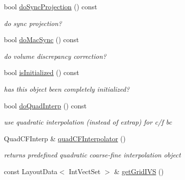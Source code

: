 \begin{DoxyCompactItemize}
\item 
\hypertarget{class_c_c_projector_comp_aded98d54b5b47205e6c60846af5e79f1}{bool \hyperlink{class_c_c_projector_comp_aded98d54b5b47205e6c60846af5e79f1}{do\-Sync\-Projection} () const }\label{class_c_c_projector_comp_aded98d54b5b47205e6c60846af5e79f1}

\begin{DoxyCompactList}\small\item\em do sync projection? \end{DoxyCompactList}\item 
\hypertarget{class_c_c_projector_comp_a7d1f68efecf98bc26f055aa5afbbff93}{bool \hyperlink{class_c_c_projector_comp_a7d1f68efecf98bc26f055aa5afbbff93}{do\-Mac\-Sync} () const }\label{class_c_c_projector_comp_a7d1f68efecf98bc26f055aa5afbbff93}

\begin{DoxyCompactList}\small\item\em do volume discrepancy correction? \end{DoxyCompactList}\item 
\hypertarget{class_c_c_projector_comp_aee178a0fa4030b63590b331e2d7cbc89}{bool \hyperlink{class_c_c_projector_comp_aee178a0fa4030b63590b331e2d7cbc89}{is\-Initialized} () const }\label{class_c_c_projector_comp_aee178a0fa4030b63590b331e2d7cbc89}

\begin{DoxyCompactList}\small\item\em has this object been completely initialized? \end{DoxyCompactList}\item 
\hypertarget{class_c_c_projector_comp_a0ea4ca95e3a16926db8d26ed9e61b664}{bool \hyperlink{class_c_c_projector_comp_a0ea4ca95e3a16926db8d26ed9e61b664}{do\-Quad\-Interp} () const }\label{class_c_c_projector_comp_a0ea4ca95e3a16926db8d26ed9e61b664}

\begin{DoxyCompactList}\small\item\em use quadratic interpolation (instead of extrap) for c/f bc \end{DoxyCompactList}\item 
\hypertarget{class_c_c_projector_comp_a8bd9b76e48aa8f850c0c2d52d8d992d0}{Quad\-C\-F\-Interp \& \hyperlink{class_c_c_projector_comp_a8bd9b76e48aa8f850c0c2d52d8d992d0}{quad\-C\-F\-Interpolator} ()}\label{class_c_c_projector_comp_a8bd9b76e48aa8f850c0c2d52d8d992d0}

\begin{DoxyCompactList}\small\item\em returns predefined quadratic coarse-\/fine interpolation object \end{DoxyCompactList}\item 
\hypertarget{class_c_c_projector_comp_a10aabd90502fe7ef8fe42d5590d28e97}{const Layout\-Data$<$ Int\-Vect\-Set $>$ \& \hyperlink{class_c_c_projector_comp_a10aabd90502fe7ef8fe42d5590d28e97}{get\-Grid\-I\-V\-S} ()}\label{class_c_c_projector_comp_a10aabd90502fe7ef8fe42d5590d28e97}


\end{DoxyCompactItemize}
